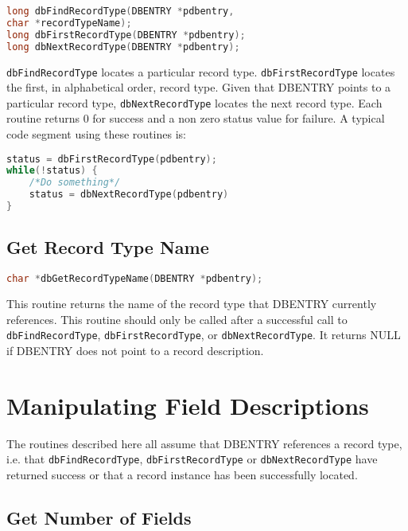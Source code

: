 \begin{lstlisting}[language=C]
long dbFindRecordType(DBENTRY *pdbentry,
char *recordTypeName);
long dbFirstRecordType(DBENTRY *pdbentry);
long dbNextRecordType(DBENTRY *pdbentry);
\end{lstlisting}

\verb|dbFindRecordType| locates a particular record type. \verb|dbFirstRecordType| locates the first, in alphabetical order, 
record type. Given that DBENTRY points to a particular record type, \verb|dbNextRecordType| locates the next record type. 
Each routine returns 0 for success and a non zero status value for failure. A typical code segment using these routines is:

\begin{lstlisting}[language=C]
status = dbFirstRecordType(pdbentry);
while(!status) {
    /*Do something*/
    status = dbNextRecordType(pdbentry)
}
\end{lstlisting}

\subsection{Get Record Type Name}

\begin{lstlisting}[language=C]
char *dbGetRecordTypeName(DBENTRY *pdbentry);
\end{lstlisting}

This routine returns the name of the record type that DBENTRY currently references. This routine should only be called 
after a successful call to \verb|dbFindRecordType|, \verb|dbFirstRecordType|, or \verb|dbNextRecordType|. It returns NULL if 
DBENTRY does not point to a record description.

\section{Manipulating Field Descriptions}

The routines described here all assume that DBENTRY references a record type, i.e. that \verb|dbFindRecordType|, \verb|dbFirstRecordType| or \verb|dbNextRecordType| have returned success or that a record instance has been successfully located.

\subsection{Get Number of Fields}

